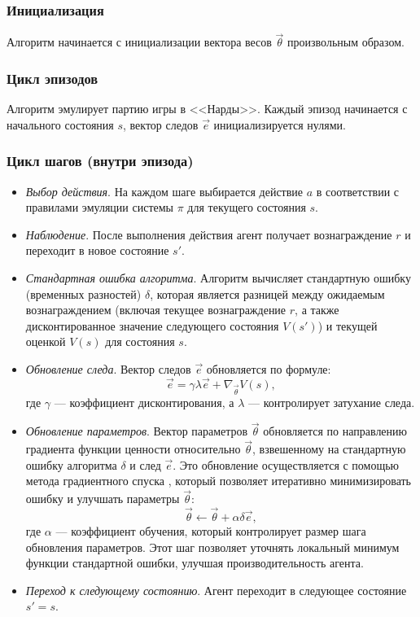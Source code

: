 
\subsubsection{Инициализация}
Алгоритм начинается с инициализации вектора весов $\vec{\theta}$ произвольным образом.

\subsubsection{Цикл эпизодов}
Алгоритм эмулирует партию игры в <<Нарды>>. Каждый эпизод начинается с начального состояния $s$, вектор следов $\vec{e}$ инициализируется нулями.

\subsubsection{Цикл шагов (внутри эпизода)}
\begin{itemize}
    \item \textit{Выбор действия}. На каждом шаге выбирается действие $a$ в соответствии с правилами эмуляции системы $\pi$ для текущего состояния $s$.
    \item \textit{Наблюдение}. После выполнения действия агент получает вознаграждение $r$ и переходит в новое состояние $s'$.
    \item \textit{Стандартная ошибка алгоритма}. Алгоритм вычисляет стандартную ошибку (временных разностей) $\delta$, которая является разницей между ожидаемым вознаграждением (включая текущее вознаграждение $r$, а также дисконтированное значение следующего состояния $V(s')$) и текущей оценкой $V(s)$ для состояния $s$.
    \item \textit{Обновление следа}. Вектор следов $\vec{e}$ обновляется по формуле:
    \begin{equation}
        \vec{e} = \gamma \lambda \vec{e} + \nabla_{\vec{\theta}} V(s),
    \end{equation}
    где $\gamma$ --- коэффициент дисконтирования, а $\lambda$ --- контролирует затухание следа.
    \item \textit{Обновление параметров}. Вектор параметров $\vec{\theta}$ обновляется по направлению градиента функции ценности относительно $\vec{\theta}$, взвешенному на стандартную ошибку алгоритма $\delta$ и след $\vec{e}$. Это обновление осуществляется с помощью метода градиентного спуска \cite{gradient-descent}, который позволяет итеративно минимизировать ошибку и улучшать параметры $\vec{\theta}$:
    \begin{equation}
        \vec{\theta} \gets \vec{\theta} + \alpha \delta \vec{e},
    \end{equation}
    где $\alpha$ — коэффициент обучения, который контролирует размер шага обновления параметров. Этот шаг позволяет уточнять локальный минимум функции стандартной ошибки, улучшая производительность агента.
    \item \textit{Переход к следующему состоянию}. Агент переходит в следующее состояние $s' = s$.
    \end{itemize}

